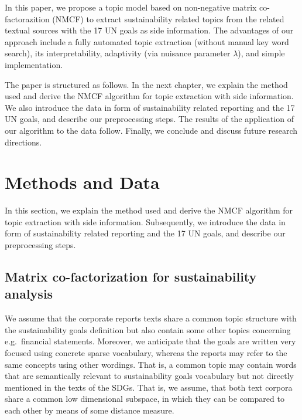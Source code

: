 \documentclass[
]{article}
\begin{document}
In this paper, we propose a topic model based on non-negative matrix co-factorazition (NMCF) to extract sustainability related topics from the related textual sources with the 17 UN goals as side information. The advantages of our approach include a fully automated topic extraction (without manual key word search), its interpretability, adaptivity (via nuisance parameter \(\lambda\)), and simple implementation.

The paper is structured as follows. In the next chapter, we explain the method used and derive the NMCF algorithm for topic extraction with side information. We also introduce the data in form of sustainability related reporting and the 17 UN goals, and describe our preprocessing steps. The results of the application of our algorithm to the data follow. Finally, we conclude and discuss future research directions.

\hypertarget{methods-and-data}{%
\section{Methods and Data}\label{methods-and-data}}

In this section, we explain the method used and derive the NMCF algorithm for topic extraction with side information. Subsequently, we introduce the data in form of sustainability related reporting and the 17 UN goals, and describe our preprocessing steps.

\hypertarget{matrix-co-factorization-for-sustainability-analysis}{%
\subsection{Matrix co-factorization for sustainability analysis}\label{matrix-co-factorization-for-sustainability-analysis}}

We assume that the corporate reports texts share a common topic structure with the sustainability goals definition but also contain some other topics concerning e.g.~financial statements. Moreover, we anticipate that the goals are written very focused using concrete sparse vocabulary, whereas the reports may refer to the same concepts using other wordings. That is, a common topic may contain words that are semantically relevant to sustainability goals vocabulary but not directly mentioned in the texts of the SDGs.
That is, we assume, that both text corpora share a common low dimensional subspace, in which they can be compared to each other by means of some distance measure.
\end{document}
